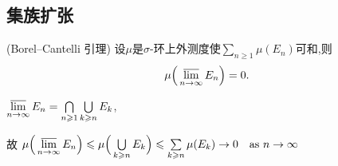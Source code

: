 \subsection{集族扩张}

\begin{1}
(Borel--Cantelli 引理) 设$\mu$是$ \sigma$-环上外测度使$\sum\limits_{n\geqslant1}\mu(E_n)$可和,则
$$\mu\Big(\varlimsup_{n\to\infty}E_n\Big)=0.$$
\end{1}
\begin{solution}
$\varlimsup\limits_{n\to\infty}E_{n}=\bigcap\limits_{n\geqslant1}\bigcup\limits_{k\geqslant n}E_{k}$,

故 $\mu\Big(\varlimsup\limits_{n\to\infty}E_{n}\Big)\leqslant\mu\Big(\bigcup\limits_{k\geqslant n}E_{k}\Big)
\leqslant\sum\limits_{k\geqslant n}\mu(E_{k})\rightarrow0\quad\mathrm{as~}n\rightarrow\infty$
\end{solution}

